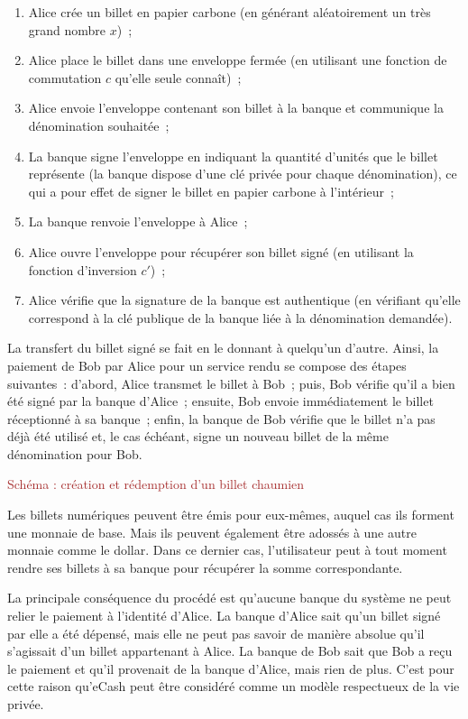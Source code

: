 \begin{enumerate}
\item Alice crée un billet en papier carbone (en générant aléatoirement un très grand nombre $x$)~;
\item Alice place le billet dans une enveloppe fermée (en utilisant une fonction de commutation $c$ qu'elle seule connaît)~;
\item Alice envoie l'enveloppe contenant son billet à la banque et communique la dénomination souhaitée~;
\item La banque signe l'enveloppe en indiquant la quantité d'unités que le billet représente (la banque dispose d'une clé privée pour chaque dénomination), ce qui a pour effet de signer le billet en papier carbone à l'intérieur~;
\item La banque renvoie l'enveloppe à Alice~;
\item Alice ouvre l'enveloppe pour récupérer son billet signé (en utilisant la fonction d'inversion $c'$)~;
\item Alice vérifie que la signature de la banque est authentique (en vérifiant qu'elle correspond à la clé publique de la banque liée à la dénomination demandée).
\end{enumerate}

La transfert du billet signé se fait en le donnant à quelqu'un d'autre. Ainsi, la paiement de Bob par Alice pour un service rendu se compose des étapes suivantes~:  d'abord, Alice transmet le billet à Bob~; puis, Bob vérifie qu'il a bien été signé par la banque d'Alice~; ensuite, Bob envoie immédiatement le billet réceptionné à sa banque~; enfin, la banque de Bob vérifie que le billet n'a pas déjà été utilisé et, le cas échéant, signe un nouveau billet de la même dénomination pour Bob.

\textcolor{brown}{Schéma : création et rédemption d'un billet chaumien}

Les billets numériques peuvent être émis pour eux-mêmes, auquel cas ils forment une monnaie de base. Mais ils peuvent également être adossés à une autre monnaie comme le dollar. Dans ce dernier cas, l'utilisateur peut à tout moment rendre ses billets à sa banque pour récupérer la somme correspondante.

La principale conséquence du procédé est qu'aucune banque du système ne peut relier le paiement à l'identité d'Alice. La banque d'Alice sait qu'un billet signé par elle a été dépensé, mais elle ne peut pas savoir de manière absolue qu'il s'agissait d'un billet appartenant à Alice. La banque de Bob sait que Bob a reçu le paiement et qu'il provenait de la banque d'Alice, mais rien de plus. C'est pour cette raison qu'eCash peut être considéré comme un modèle respectueux de la vie privée.

